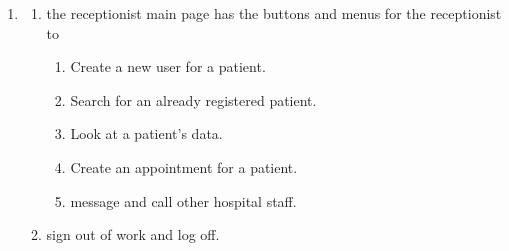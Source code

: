 \documentclass[14pt]{article}
\begin{document}
\begin{enumerate}
	\item \begin{enumerate}
			\item the receptionist main page has the buttons and menus for the receptionist to 
				\begin{enumerate}
					\item Create a new user for a patient.
					\item Search for an already registered patient.
					\item Look at a patient's data.
					\item Create an appointment for a patient. 
					\item message and call other hospital staff.
				\end{enumerate}
			\item sign out of work and log off.
		  \end{enumerate}
		  

\end{enumerate}
\end{document}
